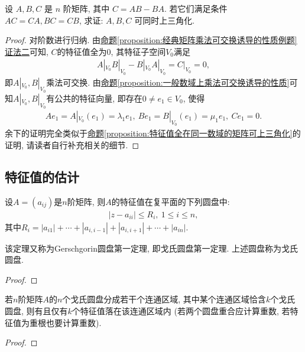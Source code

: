\documentclass[../../main.tex]{subfiles}
\begin{document}
\begin{corollary}\label{proposition:经典矩阵乘法可交换诱导的性质例题推论}
设 \(A, B, C\) 是 \(n\) 阶矩阵, 其中 \(C = AB - BA\). 若它们满足条件 \(AC = CA, BC = CB\), 求证: \(A,B,C\) 可同时上三角化.
\end{corollary}
\begin{proof}
对阶数进行归纳. 由\hyperref[proposition:经典矩阵乘法可交换诱导的性质例题]{命题\ref{proposition:经典矩阵乘法可交换诱导的性质例题}证法二}可知, \(C\)的特征值全为\(0\), 其特征子空间\(V_{0}\)满足
\begin{align*}
A|_{V_{0}}B|_{V_{0}} - B|_{V_{0}}A|_{V_{0}}=C|_{V_{0}} = 0,
\end{align*}
即\(A|_{V_{0}},B|_{V_{0}}\)乘法可交换. 由\hyperref[proposition:一般数域上乘法可交换诱导的性质]{命题\ref{proposition:一般数域上乘法可交换诱导的性质}}可知\(A|_{V_{0}},B|_{V_{0}}\)有公共的特征向量, 即存在\(0\neq e_{1} \in V_{0}\), 使得
\begin{align*}
Ae_{1}=A|_{V_{0}}(e_{1})=\lambda_{1}e_{1},\ Be_{1}=B|_{V_{0}}(e_{1})=\mu_{1}e_{1},\ Ce_{1}=0.
\end{align*}
余下的证明完全类似于\hyperref[proposition:特征值全在同一数域的矩阵可上三角化]{命题\ref{proposition:特征值全在同一数域的矩阵可上三角化}}的证明, 请读者自行补充相关的细节.
\end{proof}

\subsection{特征值的估计}

\begin{theorem}[第一圆盘定理]\label{theorem:第一圆盘定理}
设\(A = (a_{ij})\)是\(n\)阶矩阵, 则\(A\)的特征值在复平面的下列圆盘中:
\begin{align*}
|z - a_{ii}| \leq R_{i},\ 1 \leq i \leq n,
\end{align*}
其中\(R_{i} = |a_{i1}| + \cdots + |a_{i,i - 1}| + |a_{i,i + 1}| + \cdots + |a_{in}|\).
\end{theorem}
\begin{remark}
该定理又称为Gerschgorin圆盘第一定理, 即戈氏圆盘第一定理. 上述圆盘称为戈氏圆盘.
\end{remark}
\begin{proof}

\end{proof}

\begin{theorem}[第二圆盘定理]\label{theorem:第二圆盘定理}
若\(n\)阶矩阵\(A\)的\(n\)个戈氏圆盘分成若干个连通区域, 其中某个连通区域恰含\(k\)个戈氏圆盘, 则有且仅有\(k\)个特征值落在该连通区域内 (若两个圆盘重合应计算重数, 若特征值为重根也要计算重数).
\end{theorem}
\begin{proof}

\end{proof}
\end{document}
